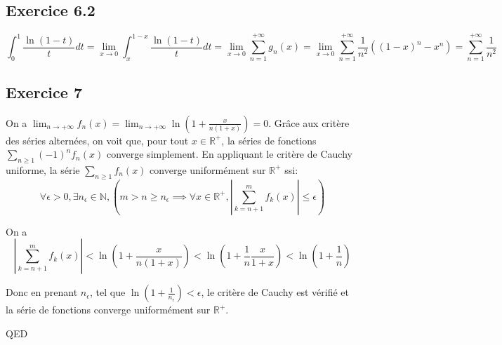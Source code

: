 \documentclass[]{book}
\theoremstyle{definition}
\newcommand{\bb}[1]{\mathbb{#1}}
\newcommand{\R}{\bb{R}}
\newcommand{\N}{\bb{N}}
\begin{document}
\subsection*{Exercice 6.2}
$$\int_{0}^{1}{\frac{\ln(1-t)}{t}dt} = \lim_{x \to 0}\int_{x}^{1-x}{\frac{\ln(1-t)}{t}dt} = \lim_{x \to 0}\sum_{n=1}^{+\infty}{g_n(x)} = \lim_{x \to 0}\sum_{n=1}^{+\infty}{\frac{1}{n^2} ((1-x)^n-x^n)} = \sum_{n=1}^{+\infty}{\frac{1}{n^2}}$$

\subsection*{Exercice 7}
On a $\lim_{n \to +\infty}f_n(x) = \lim_{n \to +\infty}\ln(1+\frac{x}{n(1+x)}) = 0$. Gr\^ace aux crit\`ere des s\'eries altern\'ees, on voit que, pour tout $x \in \R^{+}$, la s\'eries de fonctions $\sum_{n \geq 1} {(-1)^nf_n(x)}$ converge simplement. En appliquant le crit\`ere de Cauchy uniforme, la s\'erie $\sum_{n\geq 1} f_n(x)$ converge uniform\'ement sur $\R^{+}$ ssi:
$$\forall \epsilon > 0, \exists n_{\epsilon} \in \N, (m > n \geq n_{\epsilon} \implies \forall x \in \R^{+}, |\sum_{k=n+1}^{m} f_k(x)|  \leq \epsilon)$$ 

On a 
$$|\sum_{k=n+1}^{m} f_k(x)| < \ln \left(1 + \frac{x}{n(1+x)} \right) < \ln \left(1 + \frac{1}{n}\frac{x}{1+x} \right) < \ln \left(1 + \frac{1}{n} \right)$$

Donc en prenant $n_{\epsilon}$, tel que $\ln \left(1 + \frac{1}{n_{\epsilon}} \right) < \epsilon$, le crit\`ere de Cauchy est v\'erifi\'e et la s\'erie de fonctions converge uniform\'ement sur $\R^{+}$.



QED
\end{document}
